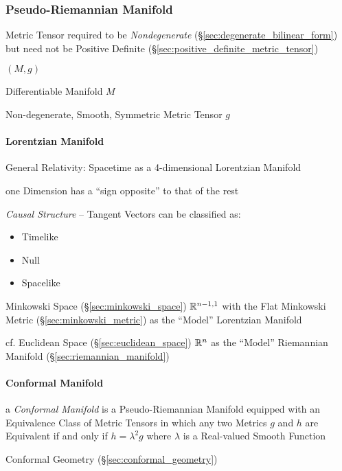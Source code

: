 \subsubsection{Pseudo-Riemannian Manifold}
\label{sec:pseudo_riemannian}

Metric Tensor required to be \emph{Nondegenerate}
(\S\ref{sec:degenerate_bilinear_form}) but need not be Positive
Definite (\S\ref{sec:positive_definite_metric_tensor})

$(M,g)$

Differentiable Manifold $M$

Non-degenerate, Smooth, Symmetric Metric Tensor $g$



\paragraph{Lorentzian Manifold}\label{sec:lorentzian_manifold}\hfill

General Relativity: Spacetime as a 4-dimensional Lorentzian Manifold

one Dimension has a ``sign opposite'' to that of the rest

\emph{Causal Structure} -- Tangent Vectors can be classified as:
\begin{itemize}
  \item Timelike
  \item Null
  \item Spacelike
\end{itemize}

Minkowski Space (\S\ref{sec:minkowski_space}) $\mathbb{R}^{n-1,1}$
with the Flat Minkowski Metric (\S\ref{sec:minkowski_metric}) as the
``Model'' Lorentzian Manifold

cf. Euclidean Space (\S\ref{sec:euclidean_space}) $\mathbb{R}^n$ as the
``Model'' Riemannian Manifold (\S\ref{sec:riemannian_manifold})



\paragraph{Conformal Manifold}\label{sec:conformal_manifold}\hfill

a \emph{Conformal Manifold} is a Pseudo-Riemannian Manifold equipped with an
Equivalence Class of Metric Tensors in which any two Metrics $g$ and $h$ are
Equivalent if and only if $h = \lambda^2 g$ where $\lambda$ is a Real-valued
Smooth Function

\fist Conformal Geometry (\S\ref{sec:conformal_geometry})



